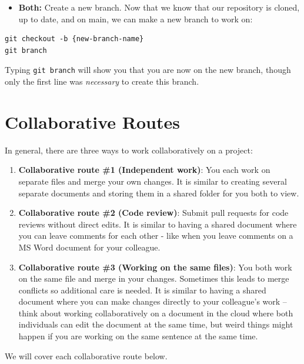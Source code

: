 \documentclass[
]{book}
\providecommand{\tightlist}{%
  \setlength{\itemsep}{0pt}\setlength{\parskip}{0pt}}
\begin{document}
\begin{itemize}
\tightlist
\item
  \textbf{Both:} Create a new branch. Now that we know that our repository is cloned,
  up to date, and on main, we can make a new branch to work on:
\end{itemize}

\begin{verbatim}
git checkout -b {new-branch-name}
git branch
\end{verbatim}

Typing \texttt{git\ branch} will show you that you are now on the new branch, though
only the first line was \emph{necessary} to create this branch.

\section{Collaborative Routes}\label{collaborative-routes}

In general, there are three ways to work collaboratively on a project:

\begin{enumerate}
\def\labelenumi{\arabic{enumi}.}
\tightlist
\item
  \textbf{Collaborative route \#1 (Independent work)}: You each work on separate files and merge your own changes. It is similar to creating several separate documents and
  storing them in a shared folder for you both to view.\\
\item
  \textbf{Collaborative route \#2 (Code review)}: Submit pull requests for code reviews without direct edits. It is similar to having a shared document where you can leave comments for each other - like when you leave comments on a MS Word document for your colleague.\\
\item
  \textbf{Collaborative route \#3 (Working on the same files)}: You both work on the same file and merge in your changes. Sometimes this leads to merge conflicts so additional care is needed. It is similar to having a shared document where you
  can make changes directly to your colleague's work -- think about working collaboratively on a document in the cloud where both individuals can edit the
  document at the same time, but weird things might happen if you are working on the same sentence at the same time.
\end{enumerate}

We will cover each collaborative route below.
\end{document}
